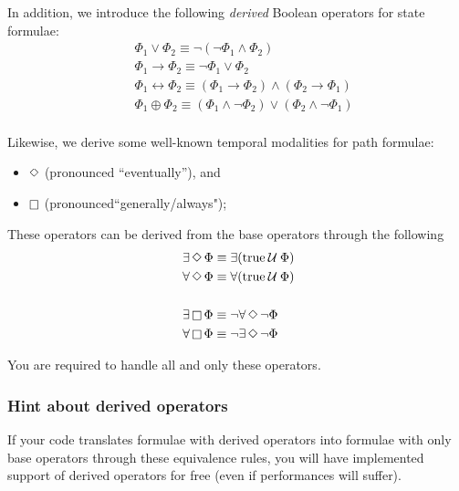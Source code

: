 \documentclass{article}
\begin{document}
In addition, we introduce the following \emph{derived} Boolean operators for state formulae: 
\begin{align*}
    &\; \Phi_1 \lor \Phi_2 \equiv \neg (\neg \Phi_1 \land \Phi_2) \\
    &\; \Phi_1 \rightarrow \Phi_2 \equiv \neg \Phi_1 \lor \Phi_2 \\
    &\; \Phi_1 \leftrightarrow  \Phi_2 \equiv (\Phi_1 \rightarrow \Phi_2) \land (\Phi_2 \rightarrow \Phi_1) \\
    &\; \Phi_1 \oplus  \Phi_2 \equiv (\Phi_1 \land \neg \Phi_2) \lor (\Phi_2 \land \neg \Phi_1)\\
\end{align*}

Likewise, we derive some well-known temporal modalities for path formulae: 
\begin{itemize}
    \item $\mathop{\Diamond}$ (pronounced ``eventually''), and
    \item $\mathop{\square}$ (pronounced``generally/always");
\end{itemize}

These operators can be derived from the base operators through the following
\begin{align*}
    &\; \exists \mathop{\Diamond} \Phi \equiv \exists(\text{true} \mathbin{\mathcal{U}} \Phi) \\ 
    &\; \forall \mathop{\Diamond} \Phi \equiv \forall(\text{true} \mathbin{\mathcal{U}} \Phi) \\ 
    &\; \\ 
    &\; \exists \mathop{\square} \Phi \equiv \neg\forall \mathop{\Diamond} \neg\Phi \\ 
    &\; \forall \mathop{\square} \Phi \equiv \neg\exists \mathop{\Diamond} \neg\Phi \\
\end{align*}

You are required to handle all and only these operators.

\subsubsection*{Hint about derived operators}
If your code translates formulae with derived operators into formulae 
with only base operators through these equivalence rules, you will have implemented support of 
derived operators for free (even if performances will suffer).
\end{document}
